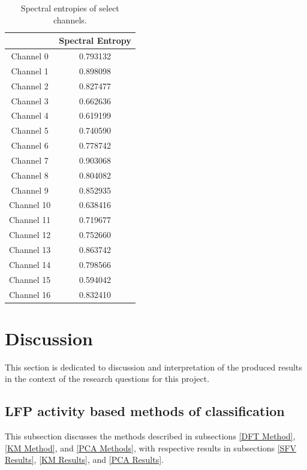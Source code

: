 \documentclass{article}
\begin{document}
\begin{table}[H]
    \centering
    \begin{tabular}{|c|c|}
    \hline
                & Spectral Entropy \\ \hline
     Channel 0  & 0.793132         \\ \hline
     Channel 1  & 0.898098         \\ \hline
     Channel 2  & 0.827477         \\ \hline
     Channel 3  & 0.662636         \\ \hline
     Channel 4  & 0.619199         \\ \hline
     Channel 5  & 0.740590         \\ \hline
     Channel 6  & 0.778742         \\ \hline
     Channel 7  & 0.903068         \\ \hline
     Channel 8  & 0.804082         \\ \hline
     Channel 9  & 0.852935         \\ \hline
     Channel 10 & 0.638416         \\ \hline
     Channel 11 & 0.719677         \\ \hline
     Channel 12 & 0.752660         \\ \hline
     Channel 13 & 0.863742         \\ \hline
     Channel 14 & 0.798566         \\ \hline
     Channel 15 & 0.594042         \\ \hline
     Channel 16 & 0.832410         \\ \hline
    \end{tabular}
    \caption{Spectral entropies of select channels.}
    \label{tab:spec_entr}
\end{table}

\newpage
\section{Discussion}

This section is dedicated to discussion and interpretation of the produced results in the context of the research questions for this project.

\subsection{LFP activity based methods of classification}

This subsection discusses the methods described in subsections \ref{DFT Method}, \ref{KM Method}, and \ref{PCA Methods}, with respective results in subsections \ref{SFV Results}, \ref{KM Results}, and \ref{PCA Results}.
\end{document}
